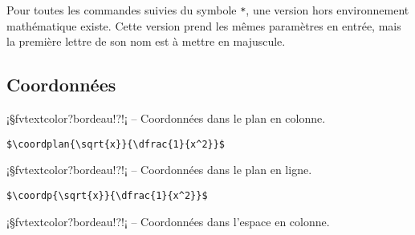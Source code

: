 \documentclass[11pt,a4paper,rgb]{report}
\begin{document}
Pour toutes les commandes suivies du symbole \textcolor{bordeau}{\texttt{*}}, une version hors environnement mathématique existe. Cette version prend les mêmes paramètres en entrée, mais la première lettre de son nom est à mettre en majuscule.

\subsection{Coordonnées}

\vspace*{.75cm}

\inCodeStub¡§fvtextcolor?bordeau!?!¡ -- Coordonnées dans le plan en colonne.

\setlength{\leftskip}{.75cm}%
\setlength{\textwidth}{17.25cm}%

\colorbox{blue!15}{}
\hfill
\begin{minipage}{.65\textwidth}
	\begin{lstlisting}[linewidth=\textwidth, language={[LaTeX]TeX}]
	$\coordplan{\sqrt{x}}{\dfrac{1}{x^2}}$
	\end{lstlisting}
\end{minipage}

\setlength{\leftskip}{0pt}
\setlength{\textwidth}{18cm}%


\vspace*{.75cm}

\inCodeStub¡§fvtextcolor?bordeau!?!¡ -- Coordonnées dans le plan en ligne.

\setlength{\leftskip}{.75cm}%
\setlength{\textwidth}{17.25cm}%

\colorbox{blue!15}{}
\hfill
\begin{minipage}{.65\textwidth}
	\begin{lstlisting}[linewidth=\textwidth, language={[LaTeX]TeX}]
	$\coordp{\sqrt{x}}{\dfrac{1}{x^2}}$
	\end{lstlisting}
\end{minipage}

\setlength{\leftskip}{0pt}
\setlength{\textwidth}{18cm}%


\vspace*{.75cm}

\inCodeStub¡§fvtextcolor?bordeau!?!¡ -- Coordonnées dans l'espace en colonne.
\end{document}
